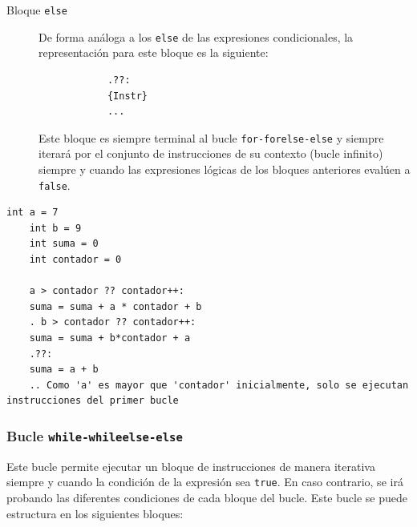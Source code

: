 \documentclass[11pt, english]{article}
\begin{document}
\begin{description}
		\item[Bloque \texttt{else}] De forma análoga a los \texttt{else} de las expresiones condicionales, la representación para este bloque es la siguiente:
		\begin{center}
			\begin{lstlisting}
			.??:
			{Instr}
			...
			\end{lstlisting}
		\end{center}
		
		Este bloque es siempre terminal al bucle \texttt{for-forelse-else} y siempre iterará por el conjunto de instrucciones de su contexto (bucle infinito) siempre y cuando las expresiones lógicas de los bloques anteriores evalúen a \texttt{false}.
	\end{description}
	\begin{lstlisting}[caption=Ejemplode uso del bucle for-forelse-else]
	int a = 7
	int b = 9
	int suma = 0
	int contador = 0
	
	a > contador ?? contador++:
	suma = suma + a * contador + b
	. b > contador ?? contador++:
	suma = suma + b*contador + a
	.??:
	suma = a + b
	.. Como 'a' es mayor que 'contador' inicialmente, solo se ejecutan instrucciones del primer bucle
	\end{lstlisting}
	
	\subsubsection{Bucle \texttt{while-whileelse-else}}\label{while}
	Este bucle permite ejecutar un bloque de instrucciones de manera iterativa siempre y cuando la condición de la expresión sea \texttt{true}. En caso contrario, se irá probando las diferentes condiciones de cada bloque del bucle. Este bucle se puede estructura en los siguientes bloques:
	
\end{document}
